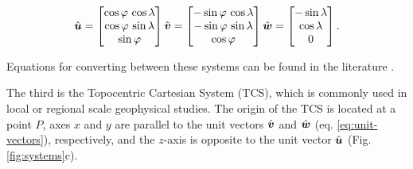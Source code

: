 \documentclass[extra]{gji}
\newcommand{\versor}[1]{\hat{\mitbf{#1}}}
\begin{document}
\begin{equation}
    \versor{u} =
    \begin{bmatrix}
        \cos\varphi \, \cos\lambda \\
        \cos\varphi \, \sin\lambda \\
        \sin\varphi
    \end{bmatrix}
    \versor{v} =
        \begin{bmatrix}
        -\sin\varphi \, \cos\lambda \\
        -\sin\varphi \, \sin\lambda \\
        \cos\varphi
    \end{bmatrix}
    \versor{w} =
    \begin{bmatrix}
        -\sin\lambda \\
        \cos\lambda \\
        0
    \end{bmatrix} .
    \label{eq:unit-vectors}
\end{equation}

\noindent Equations for converting between these systems can be found in
the literature \citep[e.g.,][]{heiskanen-moritz1967, torge2012,
bouman_etal2013}.

The third is the Topocentric Cartesian System (TCS),
which is commonly used in local or regional scale geophysical studies.
The origin of the TCS is located at a point $P$,
axes $x$ and $y$ are parallel to
the unit vectors $\versor{v}$ and $\versor{w}$
(eq. \ref{eq:unit-vectors}), respectively,
and the $z$-axis is opposite to the unit vector $\versor{u}$
(Fig. \ref{fig:systems}c).
\end{document}
